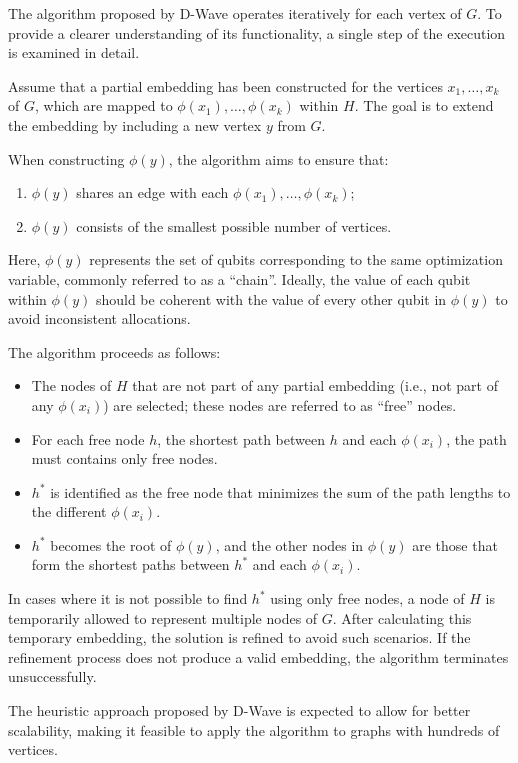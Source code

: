 The algorithm proposed by D-Wave operates iteratively for each vertex of $G$. To provide a clearer understanding of its functionality, a single step of the execution is examined in detail.

Assume that a partial embedding has been constructed for the vertices $x_1, \dots, x_k$ of $G$, which are mapped to $\phi(x_1), \dots, \phi(x_k)$ within $H$. 
The goal is to extend the embedding by including a new vertex $y$ from $G$.

When constructing $\phi(y)$, the algorithm aims to ensure that:
\begin{enumerate}
    \item $\phi(y)$ shares an edge with each $\phi(x_1), \dots, \phi(x_k)$;
    \item $\phi(y)$ consists of the smallest possible number of vertices.
\end{enumerate}

Here, $\phi(y)$ represents the set of qubits corresponding to the same optimization variable, commonly referred to as a ``chain''. 
Ideally, the value of each qubit within $\phi(y)$ should be coherent with the value of every other qubit in $\phi(y)$ to avoid inconsistent allocations.

The algorithm proceeds as follows:
\begin{itemize}
    \item The nodes of $H$ that are not part of any partial embedding (i.e., not part of any $\phi(x_i)$) are selected; these nodes are referred to as ``free'' nodes.
    \item For each free node $h$, the shortest path between $h$ and each $\phi(x_i)$, the path must contains only free nodes.
    \item $h^*$ is identified as the free node that minimizes the sum of the path lengths to the different $\phi(x_i)$.
    \item $h^*$ becomes the root of $\phi(y)$, and the other nodes in $\phi(y)$ are those that form the shortest paths between $h^*$ and each $\phi(x_i)$.
\end{itemize}

In cases where it is not possible to find $h^*$ using only free nodes, a node of $H$ is temporarily allowed to represent multiple nodes of $G$. 
After calculating this temporary embedding, the solution is refined to avoid such scenarios. If the refinement process does not produce a valid embedding, the algorithm terminates unsuccessfully.

The heuristic approach proposed by D-Wave is expected to allow for better scalability, making it feasible to apply the algorithm to graphs with hundreds of vertices.
